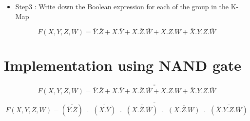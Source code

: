 \documentclass{article}
\begin{document}
    
\begin{itemize}
   
    
    \item Step3 : Write down the Boolean expression for each of the group in the K-Map 
    
\end{itemize}
 


\begin{equation}
    F(X,Y,Z,W) = \overline{Y} . \overline{Z} +  X . \overline{Y} +  X . \overline{Z}. \overline{W} +  X . Z . W +  \overline{X} . Y . Z . \overline{W}
\end{equation}

\section{Implementation using NAND gate}



\begin{equation}
    F(X,Y,Z,W) = \overline{\overline{ \overline{Y} . \overline{Z} +  X . \overline{Y} +  X . \overline{Z}. \overline{W} +  X . Z . W +  \overline{X} . Y . Z . \overline{W}}}
\end{equation}

\begin{equation}
    F(X,Y,Z,W) = \overline{ ( \overline{\overline{Y} . \overline{Z}} ) \;\; .  \;\;   \overline{ ( X . \overline{Y} ) }  \;\;  .  \;\;   \overline{ ( X . \overline{Z}. \overline{W} ) }  \;\;  .  \;\;  \overline{ ( X . Z . W ) }  \;\;  .  \;\;  \overline{ ( { \overline{X} . Y . Z . \overline{W} } ) } }
\end{equation}


\end{document}
